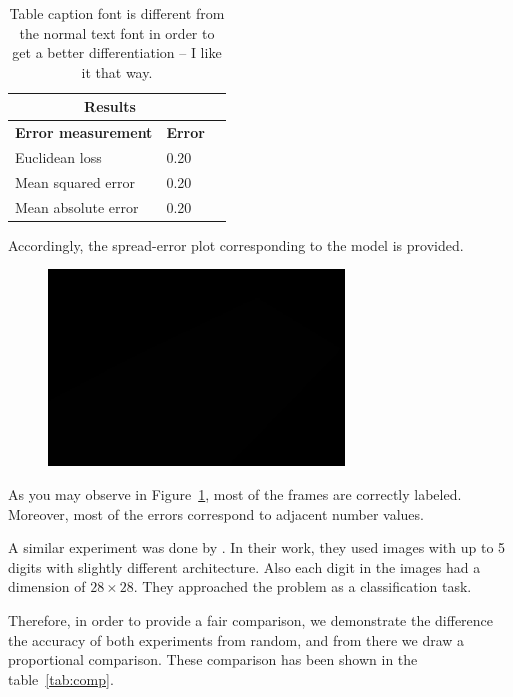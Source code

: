 \begin{table}[H]
\caption{Table caption font is different from the normal text font in order to get a better differentiation -- I like it that way.}
\centering
\small\sffamily
\begin{tabular}{llr}
\multicolumn{2}{c}{\textbf{\textbf{Results}}} \\
\bottomrule
\textbf{Error measurement}        & \textbf{Error} \\
\bottomrule
Euclidean loss           & 0.20  \\
Mean squared error       & 0.20  \\
Mean absolute error      & 0.20  \\
\bottomrule
\end{tabular}
\end{table} 

Accordingly, the spread-error plot corresponding to the model is provided.

\begin{figure}[H]
	\centering
	{\includegraphics[width=0.7\textwidth]{images/1}}
	\caption{}
	\label{fig:splot}
\end{figure}

As you may observe in Figure~\ref{fig:splot}, most
of the frames are correctly labeled. Moreover, most of the
errors correspond to adjacent number values.

A similar experiment was done by \citeauthor*{segui2015learning}. In their work, they used images with up to 5 digits with slightly different architecture. Also each digit in the images had a dimension of $28\times28$. They approached the problem as a classification task. 

\indent Therefore, in order to provide a fair comparison, we demonstrate the difference the accuracy of both experiments from random, and from there we draw a proportional comparison. These comparison has been shown in the table~\ref{tab:comp}.

